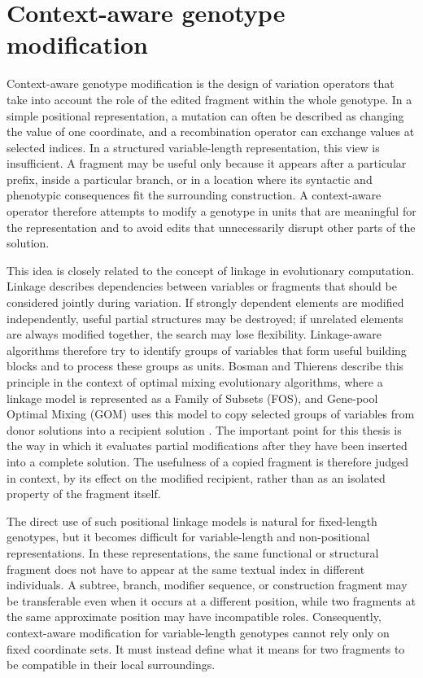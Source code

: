 \section{Context-aware genotype modification}

Context-aware genotype modification is the design of variation operators that take into account the role of the edited fragment within the whole genotype. In a simple positional representation, a mutation can often be described as changing the value of one coordinate, and a recombination operator can exchange values at selected indices. In a structured variable-length representation, this view is insufficient. A fragment may be useful only because it appears after a particular prefix, inside a particular branch, or in a location where its syntactic and phenotypic consequences fit the surrounding construction. A context-aware operator therefore attempts to modify a genotype in units that are meaningful for the representation and to avoid edits that unnecessarily disrupt other parts of the solution.

This idea is closely related to the concept of linkage in evolutionary computation. Linkage describes dependencies between variables or fragments that should be considered jointly during variation. If strongly dependent elements are modified independently, useful partial structures may be destroyed; if unrelated elements are always modified together, the search may lose flexibility. Linkage-aware algorithms therefore try to identify groups of variables that form useful building blocks and to process these groups as units. Bosman and Thierens describe this principle in the context of optimal mixing evolutionary algorithms, where a linkage model is represented as a Family of Subsets (FOS), and Gene-pool Optimal Mixing (GOM) uses this model to copy selected groups of variables from donor solutions into a recipient solution \cite{BosmanThierens2012}. The important point for this thesis is the way in which it evaluates partial modifications after they have been inserted into a complete solution. The usefulness of a copied fragment is therefore judged in context, by its effect on the modified recipient, rather than as an isolated property of the fragment itself.

The direct use of such positional linkage models is natural for fixed-length genotypes, but it becomes difficult for variable-length and non-positional representations. In these representations, the same functional or structural fragment does not have to appear at the same textual index in different individuals. A subtree, branch, modifier sequence, or construction fragment may be transferable even when it occurs at a different position, while two fragments at the same approximate position may have incompatible roles. Consequently, context-aware modification for variable-length genotypes cannot rely only on fixed coordinate sets. It must instead define what it means for two fragments to be compatible in their local surroundings.


